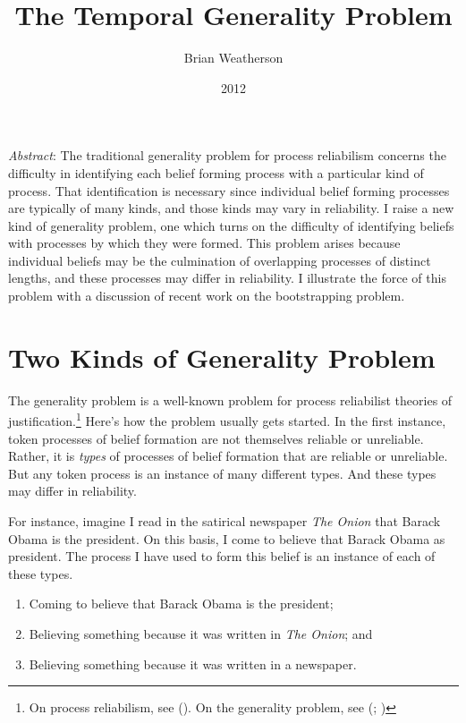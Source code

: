 \documentclass[
  11pt,
  letterpaper,
  DIV=11,
  numbers=noendperiod,
  twoside]{scrartcl}
\title{The Temporal Generality Problem}
\author{Brian Weatherson}
\date{2012}
\providecommand{\tightlist}{%
  \setlength{\itemsep}{0pt}\setlength{\parskip}{0pt}}\usepackage{longtable,booktabs,array}
\renewenvironment{abstract}
 {\vspace{-1.25cm}
 \quotation\small\noindent\emph{Abstract}:}
 {\endquotation}
\begin{document}
\maketitle
\begin{abstract}
The traditional generality problem for process reliabilism concerns the
difficulty in identifying each belief forming process with a particular
kind of process. That identification is necessary since individual
belief forming processes are typically of many kinds, and those kinds
may vary in reliability. I raise a new kind of generality problem, one
which turns on the difficulty of identifying beliefs with processes by
which they were formed. This problem arises because individual beliefs
may be the culmination of overlapping processes of distinct lengths, and
these processes may differ in reliability. I illustrate the force of
this problem with a discussion of recent work on the bootstrapping
problem.
\end{abstract}


\section{Two Kinds of Generality
Problem}\label{two-kinds-of-generality-problem}

The generality problem is a well-known problem for process reliabilist
theories of justification.\footnote{On process reliabilism, see
  (). On the generality problem,
  see (;
  )} Here's how
the problem usually gets started. In the first instance, token processes
of belief formation are not themselves reliable or unreliable. Rather,
it is \emph{types} of processes of belief formation that are reliable or
unreliable. But any token process is an instance of many different
types. And these types may differ in reliability.

For instance, imagine I read in the satirical newspaper \emph{The Onion}
that Barack Obama is the president. On this basis, I come to believe
that Barack Obama as president. The process I have used to form this
belief is an instance of each of these types.

\begin{enumerate}
\def\labelenumi{\arabic{enumi}.}
\tightlist
\item
  Coming to believe that Barack Obama is the president;
\item
  Believing something because it was written in \emph{The Onion}; and
\item
  Believing something because it was written in a newspaper.
\end{enumerate}
\end{document}
